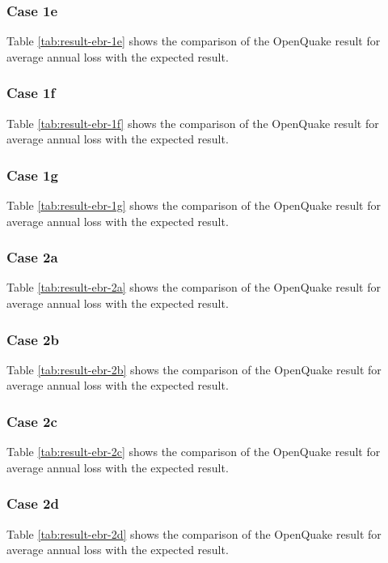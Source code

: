 \subsubsection{Case 1e}


Table \ref{tab:result-ebr-1e} shows the comparison of the OpenQuake result for average annual loss with the expected result.

\subsubsection{Case 1f}


Table \ref{tab:result-ebr-1f} shows the comparison of the OpenQuake result for average annual loss with the expected result.

\subsubsection{Case 1g}


Table \ref{tab:result-ebr-1g} shows the comparison of the OpenQuake result for average annual loss with the expected result.

\subsubsection{Case 2a}


Table \ref{tab:result-ebr-2a} shows the comparison of the OpenQuake result for average annual loss with the expected result.

\subsubsection{Case 2b}


Table \ref{tab:result-ebr-2b} shows the comparison of the OpenQuake result for average annual loss with the expected result.

\subsubsection{Case 2c}


Table \ref{tab:result-ebr-2c} shows the comparison of the OpenQuake result for average annual loss with the expected result.
\subsubsection{Case 2d}


Table \ref{tab:result-ebr-2d} shows the comparison of the OpenQuake result for average annual loss with the expected result.

